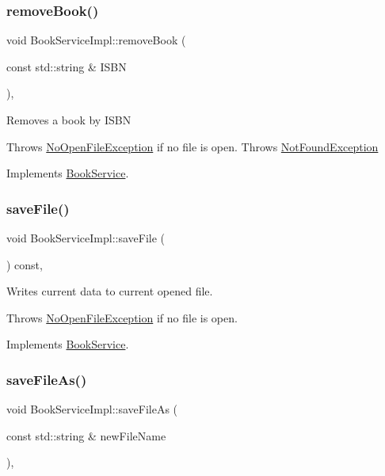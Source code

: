 \subsubsection{\texorpdfstring{remove\+Book()}{removeBook()}}
{\footnotesize\ttfamily void Book\+Service\+Impl\+::remove\+Book (\begin{DoxyParamCaption}\item[{const std\+::string \&}]{I\+S\+BN }\end{DoxyParamCaption})\hspace{0.3cm}{\ttfamily [override]}, {\ttfamily [virtual]}}

Removes a book by I\+S\+BN

Throws \hyperlink{structNoOpenFileException}{No\+Open\+File\+Exception} if no file is open. Throws \hyperlink{classNotFoundException}{Not\+Found\+Exception} 

Implements \hyperlink{classBookService_ad5736bdaca83fcfeb262b6af0ec5967a}{Book\+Service}.

\mbox{\label{classBookServiceImpl_af6b0c5e77b20b1baf2e7be7630fb56b8}} 
\subsubsection{\texorpdfstring{save\+File()}{saveFile()}}
{\footnotesize\ttfamily void Book\+Service\+Impl\+::save\+File (\begin{DoxyParamCaption}{ }\end{DoxyParamCaption}) const\hspace{0.3cm}{\ttfamily [override]}, {\ttfamily [virtual]}}

Writes current data to current opened file.

Throws \hyperlink{structNoOpenFileException}{No\+Open\+File\+Exception} if no file is open. 

Implements \hyperlink{classBookService_ade2db5e76a84d7535d43e307d955d9c3}{Book\+Service}.

\mbox{\label{classBookServiceImpl_a8d7fa1e7a5f64a7716422bd18e79c35f}} 
\subsubsection{\texorpdfstring{save\+File\+As()}{saveFileAs()}}
{\footnotesize\ttfamily void Book\+Service\+Impl\+::save\+File\+As (\begin{DoxyParamCaption}\item[{const std\+::string \&}]{new\+File\+Name }\end{DoxyParamCaption})\hspace{0.3cm}{\ttfamily [override]}, {\ttfamily [virtual]}}

